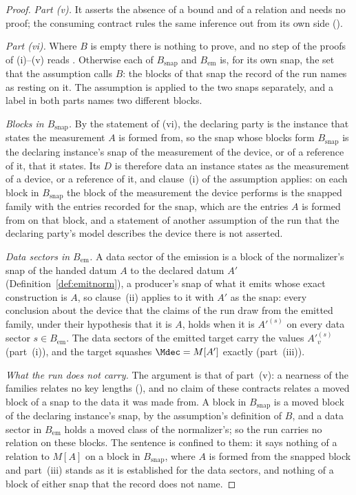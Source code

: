 \begin{proof}
\emph{Part (v).} It asserts the absence of a bound and of a relation and
needs no proof; the consuming contract rules the same inference out from its
own side ().

\emph{Part (vi).} Where $B$ is empty there is nothing to prove, and no step
of the proofs of (i)--(v) reads
. Otherwise each of
$B_{\mathrm{snap}}$ and $B_{\mathrm{em}}$ is, for its own snap, the set that
the assumption calls $B$: the blocks of that snap the record of the run
names as resting on it. The assumption is applied to the two snaps
separately, and a label in both parts names two different blocks.

\emph{Blocks in $B_{\mathrm{snap}}$.} By the statement of (vi), the
declaring party is the instance that states the measurement $A$ is formed
from, so the snap whose blocks form
$B_{\mathrm{snap}}$ is the declaring instance's snap of the measurement of
the device, or of a reference of it, that it states. Its $D$ is therefore
data an instance states as the measurement of a device, or a reference of
it, and clause~(i) of the assumption applies: on each block in
$B_{\mathrm{snap}}$ the block of the measurement the device performs is the
snapped family with the entries recorded for the snap, which are the entries
$A$ is formed from on that block, and a statement of another assumption of
the run that the declaring party's model describes the device there is not
asserted.

\emph{Data sectors in $B_{\mathrm{em}}$.} A data sector of the emission is a
block of the normalizer's snap of the handed datum $A$ to the declared datum
$A'$ (Definition~\ref{def:emitnorm}), a producer's snap of what it emits
whose exact construction is $A$, so clause~(ii) applies to it with $A'$ as
the snap: every conclusion about the device that the claims of the run draw
from the emitted family, under their hypothesis that it is $A$, holds when
it is $A'^{(s)}$ on every data sector $s\in B_{\mathrm{em}}$. The data
sectors of the emitted target carry the values $A'^{(s)}_v$ (part~(i)), and
the target squashes $\Mdec=M[A']$ exactly (part~(iii)).

\emph{What the run does not carry.} The argument is that of part~(v): a
nearness of the families relates no key lengths
(), and no claim of these contracts
relates a moved block of a snap to the data it was made from. A block in
$B_{\mathrm{snap}}$ is a moved block of the declaring instance's snap, by the
assumption's definition of $B$, and a data sector in $B_{\mathrm{em}}$ holds
a moved class of the normalizer's; so the run carries no relation on these
blocks. The sentence is confined to them: it says nothing of a relation to
$M[A]$ on a block in $B_{\mathrm{snap}}$, where $A$ is formed from the
snapped block and part~(iii) stands as it is established for the data
sectors, and nothing of a block of either snap that the record does not
name.
\end{proof}
